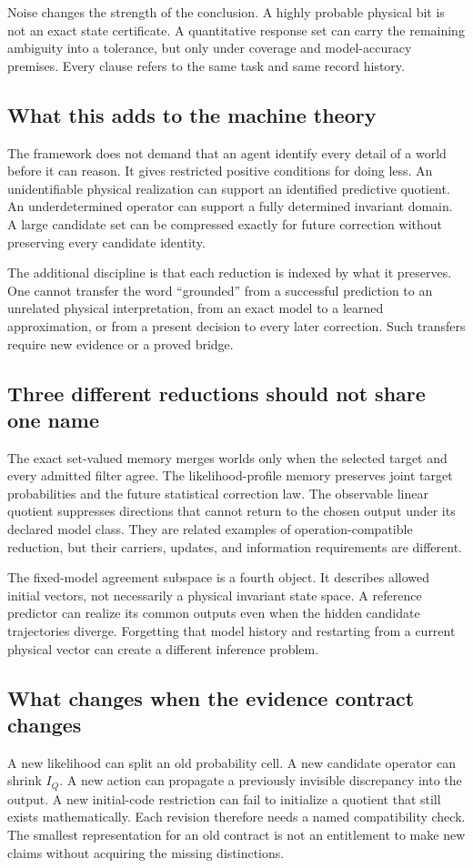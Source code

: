 \documentclass[11pt,letterpaper]{article}
\theoremstyle{plain}
\theoremstyle{definition}
\begin{document}
Noise changes the strength of the conclusion. A highly probable physical bit is not an exact state certificate. A quantitative response set can carry the remaining ambiguity into a tolerance, but only under coverage and model-accuracy premises. Every clause refers to the same task and same record history.

\subsection{What this adds to the machine theory}
The framework does not demand that an agent identify every detail of a world before it can reason. It gives restricted positive conditions for doing less. An unidentifiable physical realization can support an identified predictive quotient. An underdetermined operator can support a fully determined invariant domain. A large candidate set can be compressed exactly for future correction without preserving every candidate identity.

The additional discipline is that each reduction is indexed by what it preserves. One cannot transfer the word ``grounded'' from a successful prediction to an unrelated physical interpretation, from an exact model to a learned approximation, or from a present decision to every later correction. Such transfers require new evidence or a proved bridge.

\subsection{Three different reductions should not share one name}
The exact set-valued memory merges worlds only when the selected target and every admitted filter agree. The likelihood-profile memory preserves joint target probabilities and the future statistical correction law. The observable linear quotient suppresses directions that cannot return to the chosen output under its declared model class. They are related examples of operation-compatible reduction, but their carriers, updates, and information requirements are different.

The fixed-model agreement subspace is a fourth object. It describes allowed initial vectors, not necessarily a physical invariant state space. A reference predictor can realize its common outputs even when the hidden candidate trajectories diverge. Forgetting that model history and restarting from a current physical vector can create a different inference problem.

\subsection{What changes when the evidence contract changes}
A new likelihood can split an old probability cell. A new candidate operator can shrink $I_Q$. A new action can propagate a previously invisible discrepancy into the output. A new initial-code restriction can fail to initialize a quotient that still exists mathematically. Each revision therefore needs a named compatibility check. The smallest representation for an old contract is not an entitlement to make new claims without acquiring the missing distinctions.
\end{document}
